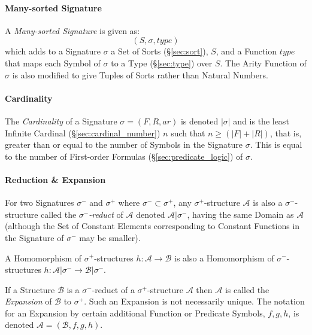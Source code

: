 \paragraph{Many-sorted Signature}\label{sec:manysorted_signature}\hfill

A \emph{Many-sorted Signature} is given as:
\[
  (S, \sigma, type)
\]
which adds to a Signature $\sigma$ a Set of Sorts (\S\ref{sec:sort}),
$S$, and a Function $type$ that maps each Symbol of $\sigma$ to a Type
(\S\ref{sec:type}) over $S$. The Arity Function of $\sigma$ is also
modified to give Tuples of Sorts rather than Natural Numbers.



\paragraph{Cardinality}\label{sec:signature_cardinality}\hfill

The \emph{Cardinality} of a Signature $\sigma = (F,R,ar)$ is denoted
$|\sigma|$ and is the least Infinite Cardinal
(\S\ref{sec:cardinal_number}) $n$ such that $n \geq (|F| + |R|)$, that
is, greater than or equal to the number of Symbols in the Signature
$\sigma$. This is equal to the number of First-order Formulas
(\S\ref{sec:predicate_logic}) of $\sigma$.



\paragraph{Reduction \& Expansion}\label{sec:reduct_expansion}\hfill

For two Signatures $\sigma^-$ and $\sigma^+$ where $\sigma^- \subset
\sigma^+$, any $\sigma^+$-structure $\mathcal{A}$ is also a
$\sigma^-$-structure called the \emph{$\sigma^-$-reduct} of
$\mathcal{A}$ denoted $\mathcal{A}|\sigma^-$, having the same Domain
as $\mathcal{A}$ (although the Set of Constant Elements corresponding
to Constant Functions in the Signature of $\sigma^-$ may be smaller).

A Homomorphism of $\sigma^+$-structures $h : \mathcal{A} \rightarrow
\mathcal{B}$ is also a Homomorphism of $\sigma^-$-structures $h :
\mathcal{A} | \sigma^- \rightarrow \mathcal{B} | \sigma^-$.

If a Structure $\mathcal{B}$ is a $\sigma^-$-reduct of a
$\sigma^+$-structure $\mathcal{A}$ then $\mathcal{A}$ is called the
\emph{Expansion} of $\mathcal{B}$ to $\sigma^+$. Such an Expansion is
not necessarily unique. The notation for an Expansion by certain
additional Function or Predicate Symbols, $f, g, h$, is denoted
$\mathcal{A} = (\mathcal{B}, f, g, h)$.



